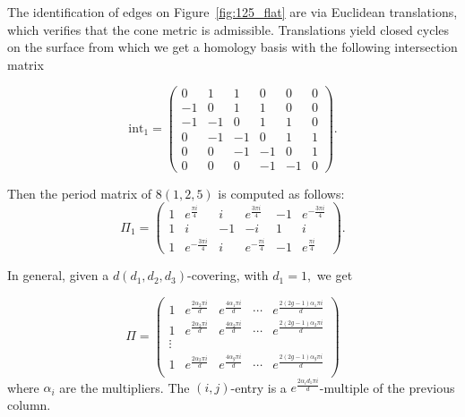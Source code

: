 \documentclass[12pt,reqno]{amsart}
\newcommand{\R}{\mathbb{R}}
\theoremstyle{definition}
\theoremstyle{remark}
\begin{document}
The identification of edges on Figure~\ref{fig:125_flat} are via Euclidean translations, which verifies that the cone metric is admissible. Translations yield closed cycles on the surface from which we get a homology basis with the following intersection matrix

$$\textrm{int}_1 = \begin{pmatrix} 0 & 1 & 1 & 0 & 0 & 0 \\
 -1 & 0 & 1 & 1 & 0 & 0 \\
 -1 & -1 & 0 & 1 & 1 & 0 \\
 0 & -1 & -1 & 0 & 1 & 1 \\
 0 & 0 & -1 & -1 & 0 & 1 \\
 0 & 0 & 0 & -1 & -1 & 0 \end{pmatrix}.$$

Then the period matrix of $8(1,2,5)$ is computed as follows: 
$$\Pi_1 = \left(
\begin{array}{cccccc}
 1 & e^{\frac{\pi i}{4}} & i & e^{\frac{3 \pi i}{4}} & -1 & e^{-\frac{3 \pi i}{4}} \\
 1 & i & -1 & -i & 1 & i \\
 1 & e^{-\frac{3 \pi i}{4}} & i & e^{-\frac{\pi i}{4}} & -1 & e^{\frac{\pi i}{4}} 
\end{array}
\right).$$


In general, given a $d(d_1,d_2,d_3)$-covering, with $d_1=1,$ we get 

$$\Pi = \left(
\begin{array}{ccccc}
 1 & e^{\frac{2 \alpha_2 \pi i}{d}} & e^{\frac{4 \alpha_1 \pi i}{d}} & \cdots & e^{\frac{2 (2 g - 1) \alpha_1 \pi i}{d}} \\
 1 & e^{\frac{2 \alpha_2 \pi i}{d}} & e^{\frac{4 \alpha_2 \pi i}{d}} & \cdots & e^{\frac{2 (2 g - 1) \alpha_2 \pi i}{d}} \\
 \vdots\\
 1 & e^{\frac{2 \alpha_2 \pi i}{d}} & e^{\frac{4 \alpha_g \pi i}{d}} & \cdots & e^{\frac{2 (2 g - 1) \alpha_g \pi i}{d}} \\
\end{array}
\right)$$
where $\alpha_i$ are the multipliers. The $(i,j)$-entry is a $e^{\frac{2\alpha_i d_1 \pi i}{d}}$-multiple of the previous column.




\end{document}
